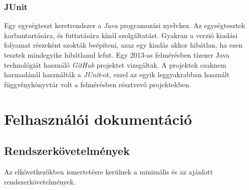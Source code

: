 \documentclass{elteikthesis}
\begin{document}
\subsection{JUnit}
Egy egységteszt keretrendszer a \emph{Java} programozási nyelvhez. Az egységtesztek karbantartására, és futtatására kínál szolgáltatást. Gyakran a verzió kiadási folyamat részeként szokták beépíteni, azaz egy kiadás akkor hibátlan, ha ezen tesztek mindegyike hibátlanul lefut. Egy 2013-as felmérésben \cite{Survey} tízezer Java technológiát használó \emph{GitHub} projektet vizsgáltak. A projektek csaknem harmadánál használták a \emph{JUnit}-ot, ezzel az egyik leggyakrabban használt függvénykönyvtár volt a felmérésben résztvevő projektekben.

\chapter{Felhasználói dokumentáció}
\section{Rendszerkövetelmények}
Az elkövetkezőkben ismertetésre kerülnek a minimális és az ajánlott rendszerkövetelmények.
\end{document}
